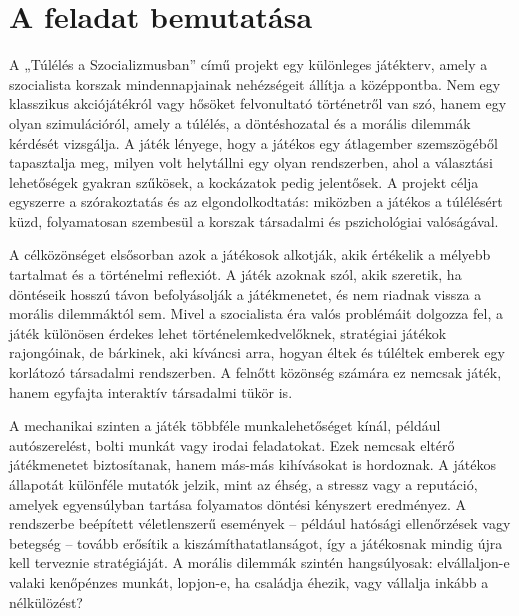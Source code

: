 \documentclass[12pt,a4paper]{article}
\begin{document}


\newpage

\pagestyle{empty}

\cleardoublepage
{}
\tableofcontents
\cleardoublepage
{}

\newpage

\pagestyle{fancy}

\section{A feladat bemutatása}

A „Túlélés a Szocializmusban” című projekt egy különleges játékterv, amely a szocialista korszak mindennapjainak nehézségeit állítja a középpontba. Nem egy klasszikus akciójátékról vagy hősöket felvonultató történetről van szó, hanem egy olyan szimulációról, amely a túlélés, a döntéshozatal és a morális dilemmák kérdését vizsgálja. A játék lényege, hogy a játékos egy átlagember szemszögéből tapasztalja meg, milyen volt helytállni egy olyan rendszerben, ahol a választási lehetőségek gyakran szűkösek, a kockázatok pedig jelentősek. A projekt célja egyszerre a szórakoztatás és az elgondolkodtatás: miközben a játékos a túlélésért küzd, folyamatosan szembesül a korszak társadalmi és pszichológiai valóságával.

A célközönséget elsősorban azok a játékosok alkotják, akik értékelik a mélyebb tartalmat és a történelmi reflexiót. A játék azoknak szól, akik szeretik, ha döntéseik hosszú távon befolyásolják a játékmenetet, és nem riadnak vissza a morális dilemmáktól sem. Mivel a szocialista éra valós problémáit dolgozza fel, a játék különösen érdekes lehet történelemkedvelőknek, stratégiai játékok rajongóinak, de bárkinek, aki kíváncsi arra, hogyan éltek és túléltek emberek egy korlátozó társadalmi rendszerben. A felnőtt közönség számára ez nemcsak játék, hanem egyfajta interaktív társadalmi tükör is.

A mechanikai szinten a játék többféle munkalehetőséget kínál, például autószerelést, bolti munkát vagy irodai feladatokat. Ezek nemcsak eltérő játékmenetet biztosítanak, hanem más-más kihívásokat is hordoznak. A játékos állapotát különféle mutatók jelzik, mint az éhség, a stressz vagy a reputáció, amelyek egyensúlyban tartása folyamatos döntési kényszert eredményez. A rendszerbe beépített véletlenszerű események – például hatósági ellenőrzések vagy betegség – tovább erősítik a kiszámíthatatlanságot, így a játékosnak mindig újra kell terveznie stratégiáját. A morális dilemmák szintén hangsúlyosak: elvállaljon-e valaki kenőpénzes munkát, lopjon-e, ha családja éhezik, vagy vállalja inkább a nélkülözést?
\end{document}
